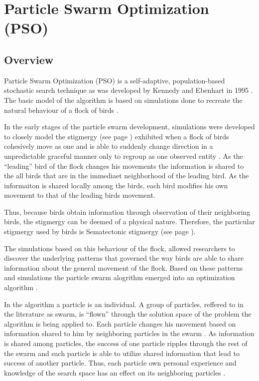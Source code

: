 \section{Particle Swarm Optimization (PSO)}
\label{sec:PSO}
\subsection{Overview}
Particle Swarm Optimization (PSO) is a self-adaptive, population-based stochastic search technique as was developed by Kennedy and Ebenhart in 1995 \cite{PSOGABreeding,PSOGABreeding}. The basic model of the algorithm is based on simulations done to recreate the natural behaviour of a flock of birds \cite{PSOSoftTesting}.

In the early stages of the particle swarm development, simulations were developed to closely model the stigmergy (see page \pageref{def:stigmergy}) exhibited when a flock of birds cohesively move as one and is able to suddenly change direction in a unpredictable graceful manner only to regroup as one observed entity \cite{PSOHybridJobShop}. As the ``leading'' bird of the flock changes his movements the information is shared to the all birds that are in the immediaet neighborhood of the leading bird. As the informaiton is shared locally among the birds, each bird modifies his own movement to that of the leading birds movement. 

Thus, because birds obtain information through observation of their neighboring birds, the stigmergy can be deemed of a physical nature. Therefore, the particular stigmergy used by birds is Sematectonic stigmergy (see page \pageref{def:sematectonic}).

The simulations based on this behaviour of the flock, allowed researchers to discover the underlying patterns that governed the way birds are able to share information about the general movement of the flock. Based on these patterns and simulations the particle swarm alogrithm emerged into an optimization algorithm \cite{CompuIntelligenceIntro}.

In the algorithm a particle is an individual. A group of particles, reffered to in the literature as swarm, is ``flown'' through the solution space of the problem the algorithm is being applied to. Each particle changes his movement based on information shared to him by neighboring particles in the swarm \cite{FundamentalSwarm,CompuIntelligenceIntro}. As information is shared among particles, the success of one particle ripples through the rest of the swarm and each particle is able to utilize shared information that lead to success of another particle. Thus, each particle own personal experience and knowledge of the search space has an effect on its neighboring particles \cite{FundamentalSwarm,CompuIntelligenceIntro}.

